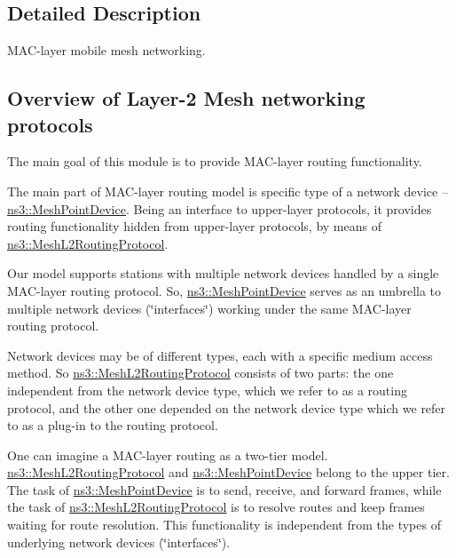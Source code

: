 \subsection{Detailed Description}
M\+A\+C-\/layer mobile mesh networking. 

\hypertarget{group__mesh_MeshOverview}{}\subsection{Overview of Layer-\/2 Mesh networking protocols}\label{group__mesh_MeshOverview}
The main goal of this module is to provide M\+A\+C-\/layer routing functionality.

The main part of M\+A\+C-\/layer routing model is specific type of a network device -- \hyperlink{classns3_1_1MeshPointDevice}{ns3\+::\+Mesh\+Point\+Device}. Being an interface to upper-\/layer protocols, it provides routing functionality hidden from upper-\/layer protocols, by means of \hyperlink{classns3_1_1MeshL2RoutingProtocol}{ns3\+::\+Mesh\+L2\+Routing\+Protocol}.

Our model supports stations with multiple network devices handled by a single M\+A\+C-\/layer routing protocol. So, \hyperlink{classns3_1_1MeshPointDevice}{ns3\+::\+Mesh\+Point\+Device} serves as an umbrella to multiple network devices (\char`\"{}interfaces\char`\"{}) working under the same M\+A\+C-\/layer routing protocol.

Network devices may be of different types, each with a specific medium access method. So \hyperlink{classns3_1_1MeshL2RoutingProtocol}{ns3\+::\+Mesh\+L2\+Routing\+Protocol} consists of two parts\+: the one independent from the network device type, which we refer to as a routing protocol, and the other one depended on the network device type which we refer to as a plug-\/in to the routing protocol.

One can imagine a M\+A\+C-\/layer routing as a two-\/tier model. \hyperlink{classns3_1_1MeshL2RoutingProtocol}{ns3\+::\+Mesh\+L2\+Routing\+Protocol} and \hyperlink{classns3_1_1MeshPointDevice}{ns3\+::\+Mesh\+Point\+Device} belong to the upper tier. The task of \hyperlink{classns3_1_1MeshPointDevice}{ns3\+::\+Mesh\+Point\+Device} is to send, receive, and forward frames, while the task of \hyperlink{classns3_1_1MeshL2RoutingProtocol}{ns3\+::\+Mesh\+L2\+Routing\+Protocol} is to resolve routes and keep frames waiting for route resolution. This functionality is independent from the types of underlying network devices (\char`\"{}interfaces\char`\"{}).

